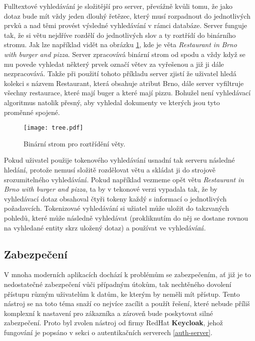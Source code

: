 \par Fulltextové vyhledávání je složitější pro server, převážně kvůli tomu, že jako dotaz bude mít vždy jeden dlouhý řetězec, který musí rozpadnout do jednotlivých prvků a nad těmi provést výsledné vyhledávání v rámci databáze. Server funguje tak, že si větu nejdříve rozdělí do jednotlivých slov a ty roztřídí do binárního stromu. Jak lze například vidět na obrázku \ref{binarni-strom}, kde je věta \textit{Restaurant in Brno with burger and pizza}. Server zpracovává binární strom od spodu a vždy když se mu povede vyhledat některý prvek označí větev za vyřešenou a již ji dále nezpracovává. Takže při použití tohoto příkladu server zjistí že uživatel hledá kolekci s názvem Restaurant, která obsahuje atribut Brno, dále server vyfiltruje všechny restaurace, které mají buger a které mají pizzu. Bohužel není vyhledávací algoritmus natolik přesný, aby vyhledal dokumenty ve kterých jsou tyto proměnné spojené.

\begin{figure}[!htb]
  \centering
  \texttt{[image: tree.pdf]}
  \caption{Binární strom pro roztřídění věty.}
  \label{binarni-strom}
\end{figure}

\par Pokud uživatel použije tokenového vyhledávání usnadní tak serveru následné hledání, protože nemusí složitě rozdělovat větu a skládat ji do strojově srozumitelného vyhledávání. Pokud například vezmeme opět větu \textit{Restaurant in Brno with burger and pizza}, ta by v tekonové verzi vypadala tak, že by vyhledávací dotaz obsahoval čtyři tokeny každý s informací o jednotlivých požadavcích. Tokenizovaé vyhledávání si užiatel může uložit do takzvaných pohledů, které může následně vyhledávat (prokliknutím do něj se dostane rovnou na vyhledané entity skrz uložený dotaz) a používat ve vyhledávání.

\subsection{Zabezpečení}
\par V mnoha moderních aplikacích dochází k problémům se zabezpečením, ať již je to nedostatečné zabezpečení vůči případným útokům, tak nechtěného dovolení přístupu různým uživatelům k datům, ke kterým by neměli mít přístup. Tento nástroj se na toto téma snaží co nejvíce zacílit a použít řešení, které nebude příliš komplexní k nastavení pro zákazníka a zároveň bude poskytovat silné zabezpečení. Proto byl zvolen nástroj od firmy RedHat \textbf{Keycloak}, jehož fungování je popsáno v sekci o autentikačních serverech \ref{auth-server}.

